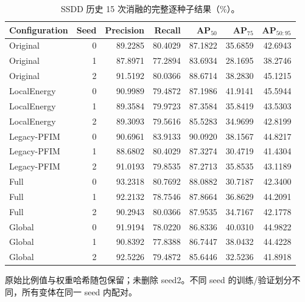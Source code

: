 \begin{table}[tp]
\centering\small
\setlength{\tabcolsep}{4pt}
\caption{SSDD 历史 15 次消融的完整逐种子结果（\%）。}\label{tab:ssdd_individual}
\begin{tabular*}{\textwidth}{@{\extracolsep{\fill}}lrrrrrr}
\toprule
Configuration & Seed & Precision & Recall & AP$_{50}$ & AP$_{75}$ & AP$_{50:95}$\\
\midrule
Original & 0 & 89.2285 & 80.4029 & 87.1822 & 35.6859 & 42.6943 \\
Original & 1 & 87.8971 & 77.2894 & 83.6934 & 28.1695 & 38.2746 \\
Original & 2 & 91.5192 & 80.0366 & 88.6714 & 38.2830 & 45.1215 \\
\midrule
LocalEnergy & 0 & 90.9989 & 79.4872 & 87.1986 & 41.9141 & 45.5944 \\
LocalEnergy & 1 & 89.3584 & 79.9723 & 87.3584 & 35.8419 & 43.5303 \\
LocalEnergy & 2 & 89.3093 & 79.5616 & 85.5283 & 34.9699 & 42.8199 \\
\midrule
Legacy-PFIM & 0 & 90.6961 & 83.9133 & 90.0920 & 38.1567 & 44.8217 \\
Legacy-PFIM & 1 & 88.6802 & 80.4029 & 87.3274 & 30.4719 & 41.4304 \\
Legacy-PFIM & 2 & 91.0193 & 79.8535 & 87.2713 & 35.8535 & 43.1189 \\
\midrule
Full & 0 & 93.2318 & 80.7692 & 88.0882 & 30.7187 & 42.3400 \\
Full & 1 & 92.2132 & 78.7546 & 87.8664 & 36.8629 & 44.2091 \\
Full & 2 & 90.2943 & 80.0366 & 87.9535 & 34.7167 & 42.1778 \\
\midrule
Global & 0 & 91.9194 & 78.0220 & 86.8336 & 40.0310 & 44.9822 \\
Global & 1 & 90.8392 & 77.8388 & 86.7447 & 38.0432 & 44.4228 \\
Global & 2 & 92.5226 & 79.4872 & 85.6446 & 32.5236 & 41.8918 \\
\bottomrule
\end{tabular*}
\smallskip
\begin{minipage}{\linewidth}\footnotesize
原始比例值与权重哈希随包保留；未删除 seed2。不同 seed 的训练/验证划分不同，所有变体在同一 seed 内配对。
\end{minipage}
\end{table}
